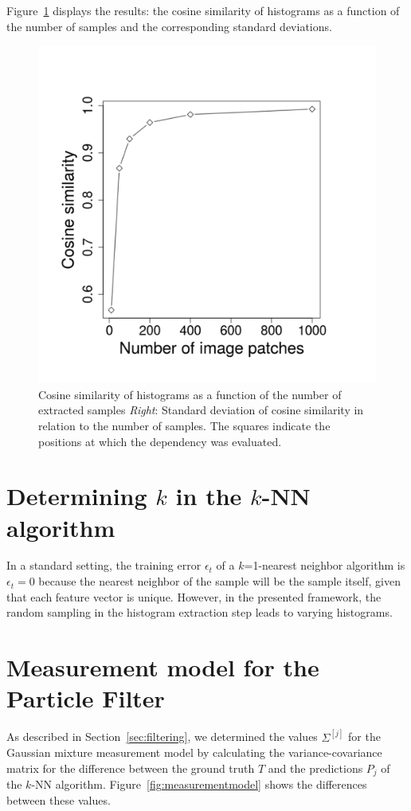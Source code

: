 \documentclass[11pt]{report}
\begin{document}
Figure~\ref{fig:cosine} displays the results: the cosine similarity of
histograms as a function of the number of samples and the
corresponding standard deviations.


\begin{figure}[h!]
\begin{center}
\includegraphics[width=0.5\columnwidth]{samples_vs_similarity}
\caption{{\label{fig:cosine} Cosine similarity of histograms as a
    function of the number of extracted samples \emph{Right}: Standard deviation
    of cosine similarity in relation to the number of samples. The
    squares indicate the positions at which the dependency was
    evaluated.%
  }}
\end{center}
\end{figure}


\section{Determining $k$ in the $k$-NN algorithm}
\label{sec:detk}

In a standard setting, the training error $\epsilon_t$ of a
$k$=1-nearest neighbor algorithm is $\epsilon_t = 0$ because the
nearest neighbor of the sample will be the sample itself, given that
each feature vector is unique. However, in the presented framework,
the random sampling in the histogram extraction step leads to varying
histograms.


\section{Measurement model for the Particle Filter}
\label{sec:measurementmodel}

As described in Section~\ref{sec:filtering}, we determined the values
$\Sigma^{[j]}$ for the Gaussian mixture measurement model by
calculating the variance-covariance matrix for the difference between
the ground truth $T$ and the predictions $P_j$ of the $k$-NN
algorithm. Figure~\ref{fig:measurementmodel} shows the differences
between these values.
\end{document}
